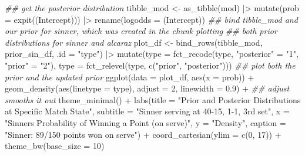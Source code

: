 \documentclass[
  letterpaper,
  DIV=11,
  numbers=noendperiod]{scrartcl}
\newenvironment{Shaded}{\begin{snugshade}}{\end{snugshade}}
\newcommand{\AttributeTok}[1]{\textcolor[rgb]{0.40,0.45,0.13}{#1}}
\newcommand{\DecValTok}[1]{\textcolor[rgb]{0.68,0.00,0.00}{#1}}
\newcommand{\DocumentationTok}[1]{\textcolor[rgb]{0.37,0.37,0.37}{\textit{#1}}}
\newcommand{\FloatTok}[1]{\textcolor[rgb]{0.68,0.00,0.00}{#1}}
\newcommand{\FunctionTok}[1]{\textcolor[rgb]{0.28,0.35,0.67}{#1}}
\newcommand{\NormalTok}[1]{\textcolor[rgb]{0.00,0.23,0.31}{#1}}
\newcommand{\OtherTok}[1]{\textcolor[rgb]{0.00,0.23,0.31}{#1}}
\newcommand{\SpecialCharTok}[1]{\textcolor[rgb]{0.37,0.37,0.37}{#1}}
\newcommand{\StringTok}[1]{\textcolor[rgb]{0.13,0.47,0.30}{#1}}
\begin{document}
\begin{Shaded}
\begin{Highlighting}[]
\DocumentationTok{\#\# get the posterior distribution}
\NormalTok{tibble\_mod }\OtherTok{\textless{}{-}} \FunctionTok{as\_tibble}\NormalTok{(mod) }\SpecialCharTok{|\textgreater{}}
  \FunctionTok{mutate}\NormalTok{(}\AttributeTok{prob =} \FunctionTok{expit}\NormalTok{(}\StringTok{\textasciigrave{}}\AttributeTok{(Intercept)}\StringTok{\textasciigrave{}}\NormalTok{)) }\SpecialCharTok{|\textgreater{}}
  \FunctionTok{rename}\NormalTok{(}\AttributeTok{logodds =} \StringTok{\textasciigrave{}}\AttributeTok{(Intercept)}\StringTok{\textasciigrave{}}\NormalTok{)}
\DocumentationTok{\#\# bind tibble\_mod and our prior for sinner, which was created in the chunk plotting}
\DocumentationTok{\#\# both prior distributions for sinner and alcaraz}
\NormalTok{plot\_df }\OtherTok{\textless{}{-}} \FunctionTok{bind\_rows}\NormalTok{(tibble\_mod, prior\_sin\_df, }\AttributeTok{.id =} \StringTok{"type"}\NormalTok{) }\SpecialCharTok{|\textgreater{}}
  \FunctionTok{mutate}\NormalTok{(}\AttributeTok{type =} \FunctionTok{fct\_recode}\NormalTok{(type, }\StringTok{"posterior"} \OtherTok{=} \StringTok{"1"}\NormalTok{,}
                           \StringTok{"prior"} \OtherTok{=} \StringTok{"2"}\NormalTok{),}
         \AttributeTok{type =} \FunctionTok{fct\_relevel}\NormalTok{(type, }\FunctionTok{c}\NormalTok{(}\StringTok{"prior"}\NormalTok{, }\StringTok{"posterior"}\NormalTok{)))}
\DocumentationTok{\#\# plot both the prior and the updated prior}
\FunctionTok{ggplot}\NormalTok{(}\AttributeTok{data =}\NormalTok{ plot\_df, }\FunctionTok{aes}\NormalTok{(}\AttributeTok{x =}\NormalTok{ prob)) }\SpecialCharTok{+}
  \FunctionTok{geom\_density}\NormalTok{(}\FunctionTok{aes}\NormalTok{(}\AttributeTok{linetype =}\NormalTok{ type), }\AttributeTok{adjust =} \DecValTok{2}\NormalTok{,}
               \AttributeTok{linewidth =} \FloatTok{0.9}\NormalTok{) }\SpecialCharTok{+} \DocumentationTok{\#\# adjust smooths it out}
  \FunctionTok{theme\_minimal}\NormalTok{() }\SpecialCharTok{+}
  \FunctionTok{labs}\NormalTok{(}\AttributeTok{title =} \StringTok{"Prior and Posterior Distributions at Specific Match State"}\NormalTok{,}
       \AttributeTok{subtitle =} \StringTok{"Sinner serving at 40{-}15, 1{-}1, 3rd set"}\NormalTok{,}
       \AttributeTok{x =} \StringTok{"Sinner\textquotesingle{}s Probability of Winning a Point (on serve)"}\NormalTok{,}
       \AttributeTok{y =} \StringTok{"Density"}\NormalTok{,}
       \AttributeTok{caption =} \StringTok{"Sinner: 89/150 points won on serve"}\NormalTok{) }\SpecialCharTok{+}
  \FunctionTok{coord\_cartesian}\NormalTok{(}\AttributeTok{ylim =} \FunctionTok{c}\NormalTok{(}\DecValTok{0}\NormalTok{, }\DecValTok{17}\NormalTok{)) }\SpecialCharTok{+}
  \FunctionTok{theme\_bw}\NormalTok{(}\AttributeTok{base\_size =} \DecValTok{10}\NormalTok{)}
\end{Highlighting}
\end{Shaded}
\end{document}
